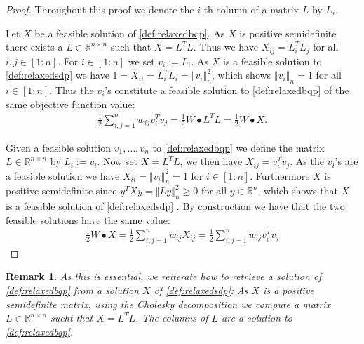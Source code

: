\documentclass[12pt,a4paper]{article}
\theoremstyle{mythm}
\newtheorem*{rem}{Remark}
\begin{document}
\begin{proof}
Throughout this proof we denote the $ i $-th column of a matrix $ L $ by $ L_i $. 

Let $ X $ be a feasible solution of \ref{def:relaxedbqp}. 
As $ X $ is positive semidefinite there exists a $ L \in \mathbb{R} ^{ n \times n }  $ such that $ X = L ^T L $. 
Thus we have $ X _{ ij } = L_i ^T L_j $ for all $ i,j \in \left[ 1:n \right]  $.
For $ i \in \left[ 1:n \right] $ we set $ v_i := L_i $.
As $ X $ is a feasible solution to \ref{def:relaxedsdp} we have $ 1 = X _{ ii } = L_i ^T L_i = \left\Vert v_i \right\Vert ^{ 2 } _{ n } $, which shows $ \left\Vert v_i
\right\Vert _{ n } = 1 $ for all $ i \in \left[ 1:n \right]  $. Thus the $ v_i $'s constitute a feasible solution to \ref{def:relaxedbqp} of the same objective function value:
\begin{align*}
\frac{ 1 }{ 2 } \sum_{ i,j = 1 }^{ n } w _{ ij } v_i ^T v_j = \frac{ 1 }{ 2 } W \bullet L^T L = \frac{ 1 }{ 2 } W \bullet X.
\end{align*} 

Given a feasible solution $ v_1 , \dots , v_n $	to \ref{def:relaxedbqp} we define the matrix $ L \in \mathbb{R} ^{ n \times n } $ by $ L_i := v_i $. 
Now set $ X = L^T L $, we then have $ X _{ ij } = v_i ^T v_j $. 
As the $ v_i $'s are a feasible solution we have $ X _{ ii } = \left\Vert v_i \right\Vert ^{ 2 } _{ n } =1 $ for $ i \in \left[ 1:n \right]  $.
Furthermore $ X $ is positive semidefinite since $ y^T X y = \left\Vert Ly \right\Vert ^{ 2 } _{ n } \geq 0  $ for all $ y \in \mathbb{R} ^{ n }  $, which shows that $ X $ is
a feasible solution of \ref{def:relaxedsdp} .
By construction we have that the two feasible solutions have the same value:
\begin{align*}
\frac{ 1 }{ 2 } W \bullet X = \frac{ 1 }{ 2 } \sum_{ i,j = 1 }^{ n } w _{ ij } X _{ ij } = \frac{ 1 }{ 2 } \sum_{ i,j = 1 }^{ n } w _{ ij } v_i ^T v_j
\end{align*} 
\end{proof}
\begin{rem}
As this is essential, we reiterate how to retrieve a solution of \ref{def:relaxedbqp} from a solution $ X $ of \ref{def:relaxedsdp}:
As $ X $ is a positive semidefinite matrix, using the Cholesky decomposition we compute a matrix $ L \in \mathbb{R} ^{ n \times n }  $ sucht that $ X = L^T L $. The columns of $
L $ are a solution to \ref{def:relaxedbqp}.
\end{rem} 
\end{document}
